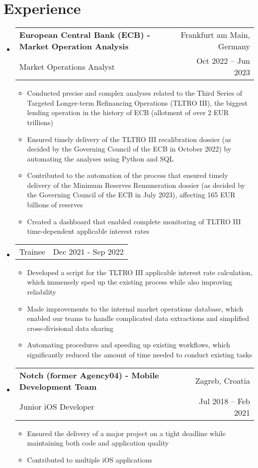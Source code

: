 \documentclass[letterpaper,11pt]{article}
\makeatletter
\newcommand{\resumeItem}[1]{
  \item\small{
    {#1 \vspace{-2pt}}
  }
}
\newcommand{\resumeSubheading}[4]{
  \vspace{-2pt}\item
    \begin{tabular*}{0.97\textwidth}[t]{l@{\extracolsep{\fill}}r}
      \textbf{#1} & #2 \\
      \small #3 & \small #4 \\
    \end{tabular*}\vspace{-7pt}
}
\newcommand{\resumeSubSubheading}[2]{
    \item
    \begin{tabular*}{0.97\textwidth}{l@{\extracolsep{\fill}}r}
      \small#1 & \small #2 \\
    \end{tabular*}\vspace{-7pt}
}
\newcommand{\resumeSubHeadingListStart}{\begin{itemize}[leftmargin=0.15in, label={}]}
\newcommand{\resumeSubHeadingListEnd}{\end{itemize}}
\newcommand{\resumeItemListStart}{\begin{itemize}}
\newcommand{\resumeItemListEnd}{\end{itemize}\vspace{-5pt}}
\makeatother
\begin{document}
\section{Experience}
  \resumeSubHeadingListStart

    \resumeSubheading
      {European Central Bank (ECB) - Market Operation Analysis}{Frankfurt am Main, Germany}
      {Market Operations Analyst}{Oct 2022 -- Jun 2023}
      \resumeItemListStart
        \resumeItem{Conducted precise and complex analyses related to the Third Series of Targeted Longer-term Refinancing Operations (TLTRO III), the biggest lending operation in the history of ECB (allotment of over 2 EUR trillions)}
        \resumeItem{Ensured timely delivery of the TLTRO III recalibration dossier (as decided by the Governing Council of the ECB in October 2022) by automating the analyses using Python and SQL}
        \resumeItem{Contributed to the automation of the process that ensured timely delivery of the Minimum Reserves Remuneration dossier (as decided by the Governing Council of the ECB in July 2023), affecting 165 EUR billions of reserves}
        \resumeItem{Created a dashboard that enabled complete monitoring of TLTRO III time-dependent applicable interest rates}
      \resumeItemListEnd

   \resumeSubSubheading
    {Trainee}{Dec 2021 - Sep 2022}
    \resumeItemListStart
       \resumeItem{Developed a script for the TLTRO III applicable interest rate calculation, which immensely sped up the existing process while also improving reliability}
       \resumeItem{Made improvements to the internal market operations database, which enabled our teams to handle complicated data extractions and simplified cross-divisional data sharing}
       \resumeItem{Automating procedures and speeding up existing workflows, which significantly reduced the amount of time needed to conduct existing tasks}
    \resumeItemListEnd

   \resumeSubheading
      {Notch (former Agency04) - Mobile Development Team}{Zagreb, Croatia}
      {Junior iOS Developer}{Jul 2018 -- Feb 2021}
      \resumeItemListStart
        \resumeItem{Ensured the delivery of a major project on a tight deadline while maintaining both code and application quality}
        \resumeItem{Contributed to multiple iOS applications}
      \resumeItemListEnd

  \resumeSubHeadingListEnd 
\end{document}
